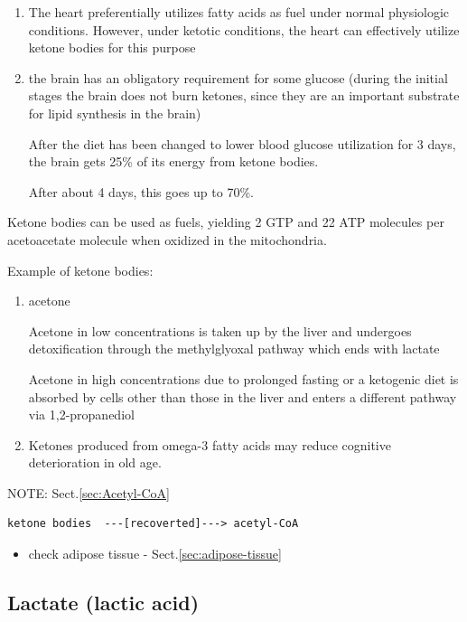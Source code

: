 \begin{enumerate}
  \item  The heart preferentially utilizes fatty acids as fuel under
normal physiologic conditions. However, under ketotic conditions, the heart can effectively utilize
ketone bodies for this purpose

  \item the brain has an obligatory requirement for some glucose (during the
  initial stages the brain does not burn ketones, since they are an important
  substrate for lipid synthesis in the brain)
  
After the diet has been changed to lower blood glucose utilization for 3 days,
the brain gets 25\% of its energy from ketone bodies.

After about 4 days, this goes up to 70\%.

\end{enumerate}

Ketone bodies can be used as fuels, yielding 2 GTP and 22 ATP molecules per
acetoacetate molecule when oxidized in the mitochondria.

Example of ketone bodies:
\begin{enumerate}
  \item acetone

Acetone in low concentrations is taken up by the liver and undergoes
detoxification through the methylglyoxal pathway which ends with lactate

 Acetone in high concentrations due to prolonged fasting or a ketogenic diet is
absorbed by cells other than those in the liver and enters a different pathway via 1,2-propanediol

  \item Ketones produced from omega-3 fatty acids may reduce cognitive
  deterioration in old age.

\end{enumerate}


NOTE: Sect.\ref{sec:Acetyl-CoA}
\begin{verbatim}
ketone bodies  ---[recoverted]---> acetyl-CoA
\end{verbatim}


\begin{itemize}
  \item check adipose tissue - Sect.\ref{sec:adipose-tissue}
\end{itemize}



\subsection{Lactate (lactic acid)}
\label{sec:lactate}
\label{sec:lactate-acidosis}

